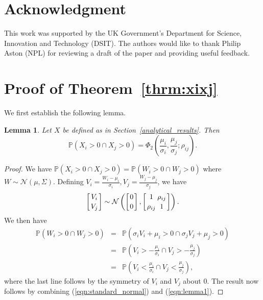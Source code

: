 \documentclass{article}
\begin{document}
\section*{Acknowledgment}

This work was supported by the UK Government’s Department for Science, Innovation and Technology (DSIT). The authors would like to thank Philip Aston (NPL) for reviewing a draft of the paper and providing useful feedback.

\appendix

\section{Proof of Theorem~\ref{thrm:xixj}}\label{proofs}

We first establish the following lemma.\\

\newtheorem{lemma}{Lemma}
\begin{lemma}
Let $X$ be defined as in Section~\ref{analytical_results}. Then 
\begin{equation}\label{truncated_prob}\mathbb{P}(X_i > 0 \cap X_j > 0) = \Phi_2 \left( \frac{\mu_i}{\sigma_i}, \frac{\mu_j}{\sigma_j}; \rho_{ij} \right).
\end{equation}
\label{lem:conprob}
\end{lemma}

\begin{proof}
   
We have $\mathbb{P}(X_i > 0 \cap X_j > 0) = \mathbb{P}(W_i > 0 \cap W_j > 0)$ where $W \sim \mathcal{N}(\mu, \Sigma)$. Defining $V_i = \frac{W_i-\mu_i}{\sigma_i}, V_j = \frac{W_j-\mu_j}{\sigma_j}$, we have
\begin{equation}\label{eqn:standard_normal}\left[ {V_i \atop V_j} \right] \sim \mathcal{N} \left( \left[ {0 \atop 0} \right], \left[ {1 \atop \rho_{ij}} {\rho_{ij} \atop 1} \right] \right).\end{equation}
We then have
\begin{eqnarray}\mathbb{P}(W_i > 0 \cap W_j > 0) &=& \mathbb{P}(\sigma_i V_i + \mu_i > 0 \cap \sigma_j V_j + \mu_j > 0)\nonumber\\&=& \mathbb{P} \left( V_i > - \frac{\mu_i}{\sigma_i} \cap V_j > - \frac{\mu_j}{\sigma_j} \right)\nonumber\\&=&\mathbb{P} \left( V_i < \frac{\mu_i}{\sigma_i} \cap V_j < \frac{\mu_j}{\sigma_j} \right),\label{eqn:lemma1}\end{eqnarray}
where the last line follows by the symmetry of $V_i$ and $V_j$ about $0$. The result now follows by combining (\ref{eqn:standard_normal}) and (\ref{eqn:lemma1}).
    
\end{proof}
\end{document}
